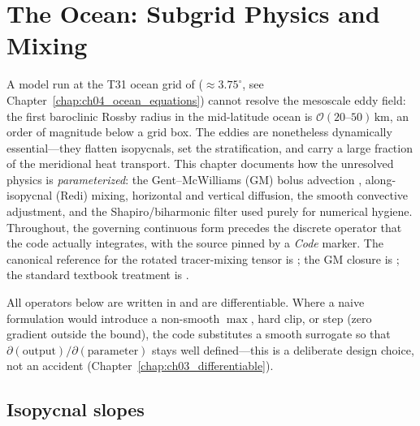 \chapter{The Ocean: Subgrid Physics and Mixing}\label{chap:ch05_ocean_mixing}

\providecommand{\Sslope}{\mathbf{S}}          %
\providecommand{\kgm}{\kappa_{\mathrm{gm}}}    %
\providecommand{\kiso}{\kappa_{\mathrm{iso}}} %
\providecommand{\kh}{\kappa_{h}}              %
\providecommand{\kv}{\kappa_{z}}             %

A model run at the T31 ocean grid of \model{} ($\approx 3.75^\circ$, see
Chapter~\ref{chap:ch04_ocean_equations}) cannot resolve the mesoscale eddy
field: the first baroclinic Rossby radius in the mid-latitude ocean is
$\mathcal{O}(20\text{--}50)\,\mathrm{km}$, an order of magnitude below a grid box.
The eddies are nonetheless dynamically essential---they flatten isopycnals, set
the stratification, and carry a large fraction of the meridional heat transport.
This chapter documents how the unresolved physics is \emph{parameterized}: the
Gent--McWilliams (GM) bolus advection \citep{gentmcwilliams1990}, along-isopycnal
(Redi) mixing, horizontal and vertical diffusion, the smooth convective
adjustment, and the Shapiro/biharmonic filter used purely for numerical hygiene.
Throughout, the governing continuous form precedes the discrete operator that the
code actually integrates, with the source pinned by a \emph{Code} marker. The
canonical reference for the rotated tracer-mixing tensor is \citet{griffies2004};
the GM closure is \citet{gentmcwilliams1990}; the standard textbook treatment is
\citet{vallis2017}.

\begin{remark}
All operators below are written in \jax{} and are differentiable. Where a naive
formulation would introduce a non-smooth $\max$, hard clip, or  step
(zero gradient outside the bound), the code substitutes a smooth surrogate so that
$\partial(\text{output})/\partial(\text{parameter})$ stays well defined---this is a
deliberate design choice, not an accident (Chapter~\ref{chap:ch03_differentiable}).
\end{remark}

\section{Isopycnal slopes}

